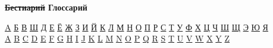 \begin{flushleft}
    \setlength{\parindent}{14pt}
    \hspace*{10pt}
    \begin{center}
        \textbf{\sout{Бестиарий} Глоссарий}
    \end{center}

\begin{center}
    \hyperlink{1}{A} \hyperlink{2}{Б} \hyperlink{p}{В} \hyperlink{4}{Ш} \hyperlink{5}{Д} \hyperlink{6}{Е} \hyperlink{7}{Ё} 
\hyperlink{8}{Ж} \hyperlink{9}{З} \hyperlink{10}{И} \hyperlink{11}{Й} \hyperlink{12}{К} \hyperlink{13}{Л} \hyperlink{14}{М}
\hyperlink{15}{Н} \hyperlink{16}{О} \hyperlink{17}{П} \hyperlink{18}{Р} \hyperlink{19}{С} \hyperlink{20}{Т} \hyperlink{21}{У} 
\hyperlink{22}{Ф} \hyperlink{23}{Х} \hyperlink{24}{Ц} \hyperlink{25}{Ч} \hyperlink{26}{Ш} \hyperlink{27}{Щ} \hyperlink{28}{Э}
\hyperlink{29}{Ю} \hyperlink{30}{Я}
\\
\hyperlink{1A}{A} \hyperlink{2B}{B} \hyperlink{33}{C} \hyperlink{44}{D} \hyperlink{55}{E} \hyperlink{66}{F} \hyperlink{77}{G} \hyperlink{88}{H}
\hyperlink{99}{I} \hyperlink{100}{J} \hyperlink{11}{K} \hyperlink{122}{L} \hyperlink{133}{M} \hyperlink{144}{N} \hyperlink{155}{O} \hyperlink{166}{P}
\hyperlink{177}{Q} \hyperlink{188}{R} \hyperlink{199}{S} \hyperlink{200}{T} \hyperlink{211}{U} \hyperlink{222}{V} \hyperlink{233}{W} \hyperlink{244}{X}
\hyperlink{255}{Y} \hyperlink{266}{Z}
\end{center}



\end{flushleft}
